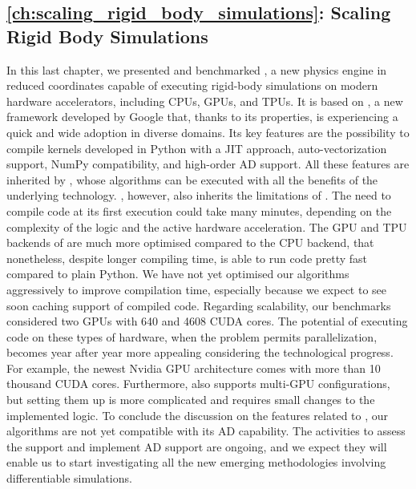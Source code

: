 \subsection*{\autoref{ch:scaling_rigid_body_simulations}: Scaling Rigid Body Simulations}

In this last chapter, we presented and benchmarked \jaxsim, a new physics engine in reduced coordinates capable of executing rigid-body simulations on modern hardware accelerators, including \acp{CPU}, \acp{GPU}, and \acp{TPU}.
It is based on \jax, a new framework developed by Google that, thanks to its properties, is experiencing a quick and wide adoption in diverse domains.
Its key features are the possibility to compile kernels developed in Python with a \ac{JIT} approach, auto-vectorization support, NumPy compatibility, and high-order \ac{AD} support.
All these features are inherited by \jaxsim, whose algorithms can be executed with all the benefits of the underlying technology.
\jaxsim, however, also inherits the limitations of \jax.
The need to compile code at its first execution could take many minutes, depending on the complexity of the logic and the active hardware acceleration.
The \ac{GPU} and \ac{TPU} backends of \jax are much more optimised compared to the \ac{CPU} backend, that nonetheless, despite longer compiling time, is able to run code pretty fast compared to plain Python.
We have not yet optimised our algorithms aggressively to improve compilation time, especially because we expect to see soon caching support of compiled code.
Regarding scalability, our benchmarks considered two \acp{GPU} with 640 and 4608 CUDA cores.
The potential of executing code on these types of hardware, when the problem permits parallelization, becomes year after year more appealing considering the technological progress.
For example, the newest Nvidia \ac{GPU} architecture comes with more than 10 thousand CUDA cores.
Furthermore, \jax also supports multi-\ac{GPU} configurations, but setting them up is more complicated and requires small changes to the implemented logic.
To conclude the discussion on the features related to \jax, our algorithms are not yet compatible with its \ac{AD} capability.
The activities to assess the support and implement \ac{AD} support are ongoing, and we expect they will enable us to start investigating all the new emerging methodologies involving differentiable simulations.

